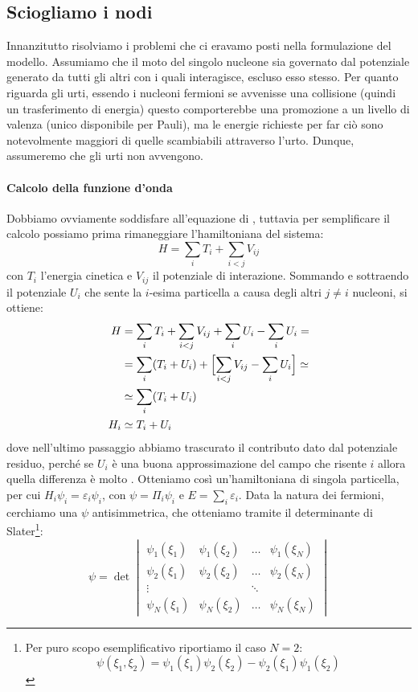 \subsection{Sciogliamo i nodi} 
Innanzitutto risolviamo i problemi che ci eravamo posti nella formulazione del modello.
Assumiamo che il moto del singolo nucleone sia governato dal potenziale generato da tutti gli altri con i quali interagisce, escluso esso stesso. Per quanto riguarda gli urti, essendo i nucleoni fermioni se avvenisse una collisione (quindi un trasferimento di energia) questo comporterebbe una promozione a un livello di valenza (unico disponibile per Pauli), ma le energie richieste per far ciò sono notevolmente maggiori di quelle scambiabili attraverso l'urto. Dunque, assumeremo che gli urti non avvengono.\\[-1cm]
\paragraph{Calcolo della funzione d'onda} Dobbiamo ovviamente soddisfare all'equazione di \Sch, tuttavia per semplificare il calcolo possiamo prima rimaneggiare l'hamiltoniana del sistema: 
$$H=\sum_i T_i + \sum_{i<j}V_{ij}$$ 
con $T_i$ l'energia cinetica e $V_{ij}$ il potenziale di interazione. Sommando e sottraendo il potenziale $U_i$ che sente la $i$-esima particella a causa degli altri $j\not =i$ nucleoni, si ottiene:
\begin{displaymath}
\begin{aligned}
H&=\sum_i T_i + \sum_{i<j}V_{ij} +\sum_i U_i - \sum_i U_i=\\
&= \sum_i (T_i + U_i) + \Bigl [ \sum_{i<j} V_{ij} - \sum_i U_i \Bigr ] \simeq\\
&\simeq \sum_i (T_i + U_i)\\
H_i &\simeq T_i + U_i
\end{aligned}
\end{displaymath}
dove nell'ultimo passaggio abbiamo trascurato il contributo dato dal potenziale residuo, perché se $U_i$ è una buona approssimazione del campo che risente $i$ allora quella differenza è molto . Otteniamo così un'hamiltoniana di singola particella, per cui $H_i \psi_i = \varepsilon_i \psi_i$, con $\psi = \Pi_i \psi_i$ e $E = \sum_i \varepsilon_i$. Data la natura dei fermioni, cerchiamo una $\psi$ antisimmetrica, che otteniamo tramite il determinante di Slater\footnote{Per puro scopo esemplificativo riportiamo il caso $N=2$:
$$\psi (\xi_1,\xi_2) = \psi_1 (\xi_1)\psi_2 (\xi_2) - \psi_2 (\xi_1)\psi_1 (\xi_2)$$}:
\begin{displaymath}
\psi = \det
\begin{vmatrix}
\psi_1 (\xi_1) & \psi_1 (\xi_2) & \dots & \psi_1 (\xi_N) \\
\psi_2 (\xi_1) & \psi_2 (\xi_2) & \dots & \psi_2 (\xi_N) \\
\vdots         &                & \ddots&                \\
\psi_N (\xi_1) & \psi_N (\xi_2) & \dots & \psi_N (\xi_N)
\end{vmatrix}
\end{displaymath}
